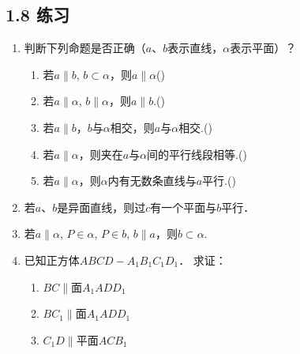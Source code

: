 \subsection*{1.8 练习}
\begin{enumerate}
\item 判断下列命题是否正确（$a$、$b$表示直线，$\alpha$表示平面）？
\begin{enumerate}[(1)]
\item 若$a\parallel b$, $b\subset \alpha$，则$a\parallel \alpha$\hfill (\qquad)
\item 若$a\parallel \alpha$, $b\parallel \alpha$，则$a\parallel b$.\hfill (\qquad)
\item 若$a\parallel b$，$b$与$\alpha$相交，则$a$与$\alpha$相交.\hfill (\qquad)
\item 若$a\parallel \alpha$，则夹在$a$与$\alpha$间的平行线段相等.\hfill (\qquad)
\item 若$a\parallel \alpha$，则$\alpha$内有无数条直线与$a$平行.\hfill (\qquad)
\end{enumerate}

    \item 若$a$、$b$是异面直线，则过$c$有一个平面与$b$平行．
    \item 若$a\parallel \alpha$, $P\in\alpha$, $P\in b$, $b\parallel a$，则$b\subset \alpha$.
    \item 已知正方体$ABCD-A_1B_1C_1D_1$．
    求证：
\begin{enumerate}[(1)]
 \item $BC\parallel $面$A_1ADD_1$
\item $BC_1\parallel $面$A_1ADD_1$
\item $C_1D\parallel $平面$ACB_1$
\end{enumerate}
    
\noindent
\begin{minipage}{.45\textwidth}
\centering
{}
\end{minipage}
\hfill
\begin{minipage}{.45\textwidth}
\centering
{}
\end{minipage}
\end{enumerate}
